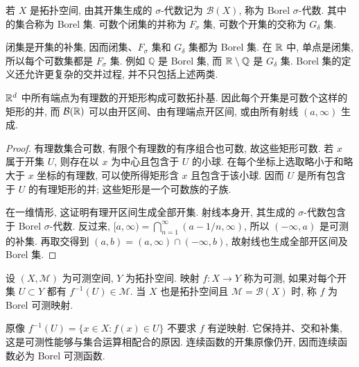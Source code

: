 \begin{definition}
若 $X$ 是拓扑空间, 由其开集生成的 $\sigma$-代数记为 $\mathcal B(X)$, 称为 Borel $\sigma$-代数. 其中的集合称为 Borel 集. 可数个闭集的并称为 $F_\sigma$ 集, 可数个开集的交称为 $G_\delta$ 集.
\end{definition}
闭集是开集的补集, 因而闭集、$F_\sigma$ 集和 $G_\delta$ 集都为 Borel 集. 在 $\mathbb R$ 中, 单点是闭集, 所以每个可数集都是 $F_\sigma$ 集. 例如 $\mathbb Q$ 是 Borel 集, 而 $\mathbb R\setminus\mathbb Q$ 是 $G_\delta$ 集. Borel 集的定义还允许更复杂的交并过程, 并不只包括上述两类.

\begin{proposition}[编者补充]\label{ra:c1:countable-base}
$\mathbb R^d$ 中所有端点为有理数的开矩形构成可数拓扑基. 因此每个开集是可数个这样的矩形的并, 而 $\mathcal B(\mathbb R)$ 可以由开区间、由有理端点开区间, 或由所有射线 $(a,\infty)$ 生成.
\end{proposition}
\begin{proof}
有理数集合可数, 有限个有理数的有序组合也可数, 故这些矩形可数. 若 $x$ 属于开集 $U$, 则存在以 $x$ 为中心且包含于 $U$ 的小球. 在每个坐标上选取略小于和略大于 $x$ 坐标的有理数, 可以使所得矩形含 $x$ 且包含于该小球. 因而 $U$ 是所有包含于 $U$ 的有理矩形的并; 这些矩形是一个可数族的子族.

在一维情形, 这证明有理开区间生成全部开集. 射线本身开, 其生成的 $\sigma$-代数包含于 Borel $\sigma$-代数. 反过来, $[a,\infty)=\bigcap_{n=1}^{\infty}(a-1/n,\infty)$, 所以 $(-\infty,a)$ 是可测的补集. 再取交得到 $(a,b)=(a,\infty)\cap(-\infty,b)$, 故射线也生成全部开区间及 Borel 集.
\end{proof}

\begin{definition}\label{ra:c1:measurable}
设 $(X,\mathcal M)$ 为可测空间, $Y$ 为拓扑空间. 映射 $f:X\to Y$ 称为可测, 如果对每个开集 $U\subset Y$ 都有 $f^{-1}(U)\in\mathcal M$. 当 $X$ 也是拓扑空间且 $\mathcal M=\mathcal B(X)$ 时, 称 $f$ 为 Borel 可测映射.
\end{definition}
原像 $f^{-1}(U)=\{x\in X:f(x)\in U\}$ 不要求 $f$ 有逆映射. 它保持并、交和补集, 这是可测性能够与集合运算相配合的原因. 连续函数的开集原像仍开, 因而连续函数必为 Borel 可测函数.


